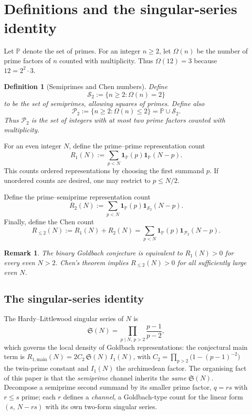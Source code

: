 \documentclass[]{interact}%
\newtheorem{definition}{Definition}
\newtheorem{remark}{Remark}
\newcommand{\PP}{\mathbb P}
\newcommand{\SSemi}{\mathcal S_2}
\newcommand{\Ptwo}{\mathcal P_2}
\newcommand{\ones}{\mathbf 1}
\newcommand{\OmegaF}{\Omega}
\newcommand{\sing}{\mathfrak S}
\begin{document}
\section{Definitions and the singular-series identity}
\label{sec:defs}

Let $\PP$ denote the set of primes. For an integer $n\ge2$, let $\OmegaF(n)$ be the number of prime factors of $n$ counted with multiplicity. Thus $\OmegaF(12)=3$ because $12=2^2\cdot 3$.

\begin{definition}[Semiprimes and Chen numbers]
Define
\[
  \SSemi := \{n\ge2 : \OmegaF(n)=2\}
\]
to be the set of semiprimes, allowing squares of primes. Define also
\[
  \Ptwo := \{n\ge2 : \OmegaF(n)\le 2\} = \PP \cup \SSemi.
\]
Thus $\Ptwo$ is the set of integers with at most two prime factors counted with multiplicity.
\end{definition}

For an even integer $N$, define the prime--prime representation count
\begin{equation}
  R_{1}(N) := \sum_{p<N} \ones_{\PP}(p)\ones_{\PP}(N-p).
  \label{eq:R1}
\end{equation}
This counts ordered representations by choosing the first summand $p$. If unordered counts are desired, one may restrict to $p\le N/2$.

Define the prime--semiprime representation count
\begin{equation}
  R_{2}(N) := \sum_{p<N} \ones_{\PP}(p)\ones_{\SSemi}(N-p).
  \label{eq:R2}
\end{equation}
Finally, define the Chen count
\begin{equation}
  R_{\le2}(N) := R_1(N)+R_2(N)
  = \sum_{p<N}\ones_{\PP}(p)\ones_{\Ptwo}(N-p).
  \label{eq:Rle2}
\end{equation}

\begin{remark}
The binary Goldbach conjecture is equivalent to $R_1(N)>0$ for every even $N>2$. Chen's theorem implies $R_{\le2}(N)>0$ for all sufficiently large even $N$.
\end{remark}

\subsection{The singular-series identity}
\label{sec:identity}

The Hardy--Littlewood singular series of $N$ is
\[
  \sing(N)=\prod_{p\mid N,\,p>2}\frac{p-1}{p-2},
\]
which governs the local density of Goldbach representations: the conjectural main term is
$R_{1,\mathrm{main}}(N)=2C_2\,\sing(N)\,I_1(N)$, with $C_2=\prod_{p>2}\big(1-(p-1)^{-2}\big)$ the
twin-prime constant and $I_1(N)$ the archimedean factor. The organising fact of this paper is
that the \emph{semiprime} channel inherits the \emph{same} $\sing(N)$. Decompose a semiprime
second summand by its smaller prime factor, $q=rs$ with $r\le s$ prime; each $r$ defines a
\emph{channel}, a Goldbach-type count for the linear form $(s,\,N-rs)$ with its own two-form
singular series.
\end{document}
